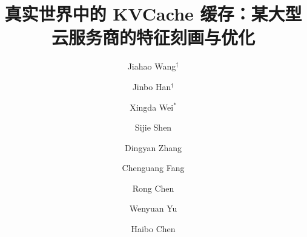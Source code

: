 \documentclass[10pt,letterpaper,twocolumn]{article}
\begin{document}
\title{\bfseries 真实世界中的 KVCache 缓存：\newline 某大型云服务商的特征刻画与优化}
\author[1]{Jiahao Wang$^\dagger$}
\author[1]{Jinbo Han$^\dagger$}
\author[1]{Xingda Wei$^*$}
\author[2]{Sijie Shen}
\author[1]{Dingyan Zhang}
\author[2]{Chenguang Fang}
\author[1]{Rong Chen}
\author[2]{Wenyuan Yu}
\author[1]{Haibo Chen}
\date{}
\maketitle

\begingroup\renewcommand\thefootnote{}\endgroup










\balance
{\small


}

\appendix
\clearpage

\end{document}
